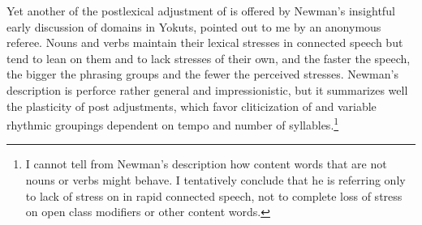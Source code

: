 \documentclass[output=paper,
modfonts
]{LSP/langsci}
\begin{document}
Yet another  of the postlexical adjustment of  is offered by Newman’s \citeyearpar[28--29]{newman1944} insightful early discussion of  domains in Yokuts, pointed out to me by an anonymous referee. Nouns and verbs maintain their lexical stresses in connected speech but  tend to lean on them and to lack stresses of their own, and the faster the speech, the bigger the phrasing groups and the fewer the perceived stresses. Newman’s description is perforce rather general and impressionistic, but it summarizes well the plasticity of post adjustments, which favor cliticization of  and variable rhythmic groupings dependent on tempo and number of syllables.\footnote{I cannot tell from Newman’s description how content words that are not nouns or verbs might behave. I tentatively conclude that he is referring only to lack of stress on  in rapid connected speech, not to complete loss of stress on open class modifiers or other content words.}
\end{document}
